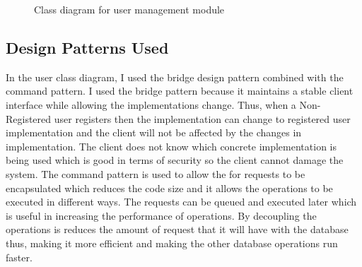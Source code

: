 \begin{figure}[H]
	\caption{Class diagram for user management module}\label{visina8}
\end{figure}
\subsection{Design Patterns Used}
		In the user class diagram, I used the bridge design pattern combined with the command pattern. I used the bridge pattern because it maintains a stable client interface while allowing the implementations change. Thus, when a Non-Registered user registers then the implementation can change to registered user implementation and the client will not be affected by the changes in implementation. The client does not know which concrete implementation is being used which is good in terms of security so the client cannot damage the system. The command pattern is used to allow the for requests to be encapsulated which reduces the code size and it allows the operations to be executed in different ways. The requests can be queued and executed later which is useful in increasing the performance of operations. By decoupling the operations is reduces the amount of request that it will have with the database thus, making it more efficient and making the other database operations run faster.
		
